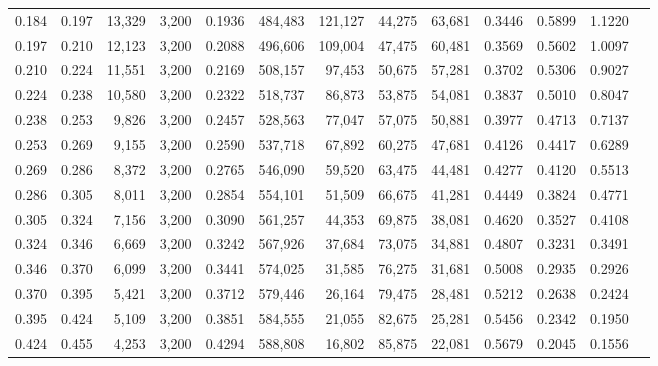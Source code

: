 \begin{tabular}{rrrrrrrrrrrrr}
0.184 & 0.197 &  13,329 & 3,200 &                                     0.1936 & 484,483 & 121,127 &  44,275 &  63,681 & 0.3446 & 0.5899 & 1.1220 \\
0.197 & 0.210 &  12,123 & 3,200 &                                     0.2088 & 496,606 & 109,004 &  47,475 &  60,481 & 0.3569 & 0.5602 & 1.0097 \\
0.210 & 0.224 &  11,551 & 3,200 &                                     0.2169 & 508,157 &  97,453 &  50,675 &  57,281 & 0.3702 & 0.5306 & 0.9027 \\
0.224 & 0.238 &  10,580 & 3,200 &                                     0.2322 & 518,737 &  86,873 &  53,875 &  54,081 & 0.3837 & 0.5010 & 0.8047 \\
0.238 & 0.253 &   9,826 & 3,200 &                                     0.2457 & 528,563 &  77,047 &  57,075 &  50,881 & 0.3977 & 0.4713 & 0.7137 \\
0.253 & 0.269 &   9,155 & 3,200 &                                     0.2590 & 537,718 &  67,892 &  60,275 &  47,681 & 0.4126 & 0.4417 & 0.6289 \\
0.269 & 0.286 &   8,372 & 3,200 &                                     0.2765 & 546,090 &  59,520 &  63,475 &  44,481 & 0.4277 & 0.4120 & 0.5513 \\
0.286 & 0.305 &   8,011 & 3,200 &                                     0.2854 & 554,101 &  51,509 &  66,675 &  41,281 & 0.4449 & 0.3824 & 0.4771 \\
0.305 & 0.324 &   7,156 & 3,200 &                                     0.3090 & 561,257 &  44,353 &  69,875 &  38,081 & 0.4620 & 0.3527 & 0.4108 \\
0.324 & 0.346 &   6,669 & 3,200 &                                     0.3242 & 567,926 &  37,684 &  73,075 &  34,881 & 0.4807 & 0.3231 & 0.3491 \\
0.346 & 0.370 &   6,099 & 3,200 &                                     0.3441 & 574,025 &  31,585 &  76,275 &  31,681 & 0.5008 & 0.2935 & 0.2926 \\
0.370 & 0.395 &   5,421 & 3,200 &                                     0.3712 & 579,446 &  26,164 &  79,475 &  28,481 & 0.5212 & 0.2638 & 0.2424 \\
0.395 & 0.424 &   5,109 & 3,200 &                                     0.3851 & 584,555 &  21,055 &  82,675 &  25,281 & 0.5456 & 0.2342 & 0.1950 \\
0.424 & 0.455 &   4,253 & 3,200 &                                     0.4294 & 588,808 &  16,802 &  85,875 &  22,081 & 0.5679 & 0.2045 & 0.1556 \\

\end{tabular}
